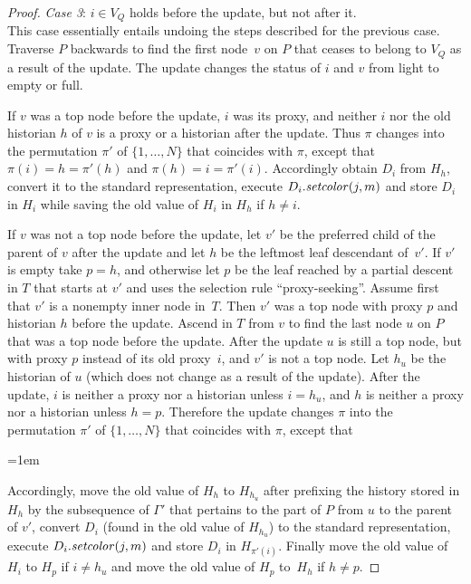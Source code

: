 \documentclass[envcountsame,envcountsect,undated,nolinenumbers]{lnthi}
\def\Tvn#1{\hbox{\textit{#1\/}}}
\begin{document}
\begin{proof}
\medskip
\emph{Case 3}:
$i\in V_Q$ holds before the update, but not after it.\\
This case essentially entails undoing the steps
described for the previous case.
Traverse $P$ backwards to find the first node~$v$
on $P$ that ceases to belong to $V_Q$ as a result of the update.
The update changes the status of $i$ and $v$
from light to empty or full.

If $v$ was a top node before the update,
$i$ was its proxy, and neither $i$ nor the
old historian $h$ of $v$ is a proxy or a
historian after the update.
Thus $\pi$ changes into the permutation
$\pi'$ of $\{1,\ldots,N\}$ that coincides with $\pi$,
except that
$\pi(i)=h=\pi'(h)$ and
$\pi(h)=i=\pi'(i)$.
Accordingly obtain $D_i$ from $H_h$,
convert it to the standard representation,
execute $D_i.\Tvn{setcolor}(j,m)$
and store $D_i$ in $H_i$ while
saving the old value of $H_i$ in $H_h$ if $h\not=i$.

If $v$ was not a top node before the update,
let $v'$ be the preferred child of the parent of
$v$ after the update and let $h$
be the leftmost leaf descendant of~$v'$.
If $v'$ is empty take $p=h$, and otherwise let
$p$ be the leaf reached by
a partial descent in $T$ that starts at $v'$
and uses the selection rule ``proxy-seeking''.
Assume first that $v'$ is a nonempty inner node in~$T$.
Then $v'$ was a top node with proxy $p$
and historian $h$ before the update.
Ascend in $T$ from $v$ to find the last node $u$
on $P$ that was a top node before the update.
After the update $u$ is still a top node, but
with proxy $p$ instead of its old proxy~$i$,
and $v'$ is not a top node.
Let $h_u$ be the historian of $u$
(which does not change as a result of the update).
After the update, $i$ is neither a proxy nor a historian
unless $i=h_u$, and $h$ is neither a proxy nor
a historian unless $h=p$.
Therefore the update changes $\pi$ into the
permutation $\pi'$ of $\{1,\ldots,N\}$ that coincides
with $\pi$, except that

\medskip

\centerline{\vbox{\tabskip=1em}}

\medskip
\noindent
Accordingly, 
move the old value of $H_h$ to $H_{h_u}$
after prefixing the history stored
in $H_h$ by the subsequence of $\Gamma'$ that pertains to
the part of $P$ from $u$ to the parent of $v'$,
convert $D_i$ (found in the old value of $H_{h_u}$)
to the standard representation,
execute $D_i.\Tvn{setcolor}(j,m)$
and store $D_i$ in $H_{\pi'(i)}$.
Finally move the old value of $H_i$ to $H_p$ if $i\not=h_u$
and move the old value of $H_p$ to~$H_h$
if $h\not=p$.


\end{proof}
\end{document}

